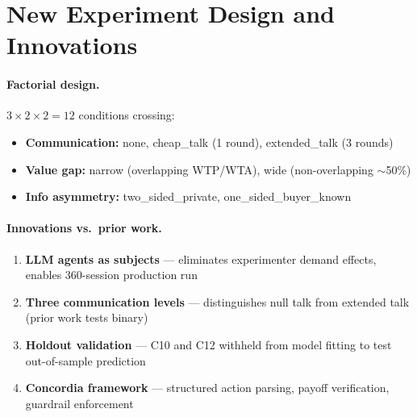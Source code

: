 \documentclass[11pt]{article}
\begin{document}
\section{New Experiment Design and Innovations}

\paragraph{Factorial design.} $3 \times 2 \times 2 = 12$ conditions crossing:
\begin{itemize}
\item \textbf{Communication:} none, cheap\_talk (1 round), extended\_talk (3 rounds)
\item \textbf{Value gap:} narrow (overlapping WTP/WTA), wide (non-overlapping $\sim$50\%)
\item \textbf{Info asymmetry:} two\_sided\_private, one\_sided\_buyer\_known
\end{itemize}

\paragraph{Innovations vs.\ prior work.}
\begin{enumerate}
\item \textbf{LLM agents as subjects} --- eliminates experimenter demand effects, enables 360-session production run
\item \textbf{Three communication levels} --- distinguishes null talk from extended talk (prior work tests binary)
\item \textbf{Holdout validation} --- C10 and C12 withheld from model fitting to test out-of-sample prediction
\item \textbf{Concordia framework} --- structured action parsing, payoff verification, guardrail enforcement
\end{enumerate}
\end{document}
